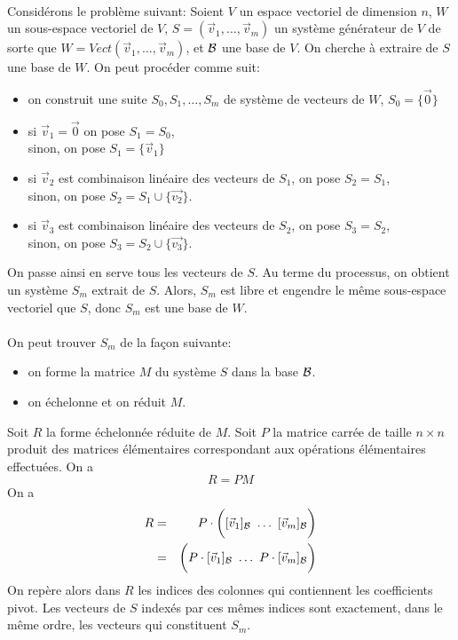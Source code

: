 \paragraph{} Considérons le problème suivant: Soient $V$ un espace vectoriel de dimension $n$, $W$ un sous-espace vectoriel de $V$, $S = (\vec{v}_1, \ldots, \vec{v}_m)$ un système générateur de $V$ de sorte que $W = Vect(\vec{v}_1, \ldots, \vec{v}_m)$, et $\mathcal{B}$ une base de $V$. On cherche à extraire de $S$ une base de $W$. On peut procéder comme suit:
\begin{itemize}
  \item on construit une suite $S_0, S_1, \ldots, S_m$ de système de vecteurs de $W$, $S_0 = \{\vec{0}\}$
  \item si $\vec{v}_1 = \vec{0}$ on pose $S_1 = S_0$, \\
    sinon, on pose $S_1 = \{\vec{v}_1\}$
  \item si $\vec{v}_2$ est combinaison linéaire des vecteurs de $S_1$, on pose $S_2 = S_1$, \\
    sinon, on pose $S_2 = S_1 \cup \{\vec{v_2}\}$.
  \item si $\vec{v}_3$ est combinaison linéaire des vecteurs de $S_2$, on pose $S_3 = S_2$, \\
    sinon, on pose $S_3 = S_2 \cup \{\vec{v_3}\}$.
\end{itemize}
On passe ainsi en serve tous les vecteurs de $S$. Au terme du processus, on obtient un système $S_m$ extrait de $S$. Alors, $S_m$ est libre et engendre le même sous-espace vectoriel que $S$,  donc $S_m$ est une base de $W$. 
\\\\
On peut trouver $S_m$ de la façon suivante:
\begin{itemize}
  \item on forme la matrice $M$ du système $S$ dans la base $\mathcal{B}$.
  \item on échelonne et on réduit $M$.
\end{itemize}
Soit $R$ la forme échelonnée réduite de $M$. Soit $P$ la matrice carrée de taille $n\times n$ produit des matrices élémentaires correspondant aux opérations élémentaires effectuées. On a 
$$R = P M$$
On a 
\begin{eqnarray*}
  R &=& P \cdot \bigg([\vec{v}_1]_{\mathcal{B}} ~ \hdots ~ [\vec{v}_m]_{\mathcal{B}} \bigg) \\
   &=& \bigg(P \cdot [\vec{v}_1]_{\mathcal{B}} ~ \hdots ~ P \cdot [\vec{v}_m]_{\mathcal{B}} \bigg) \\
\end{eqnarray*}
On repère alors dans $R$ les indices des colonnes qui contiennent les coefficients pivot. Les vecteurs de $S$ indexés par ces mêmes indices sont exactement, dans le même ordre, les vecteurs qui constituent $S_m$.

